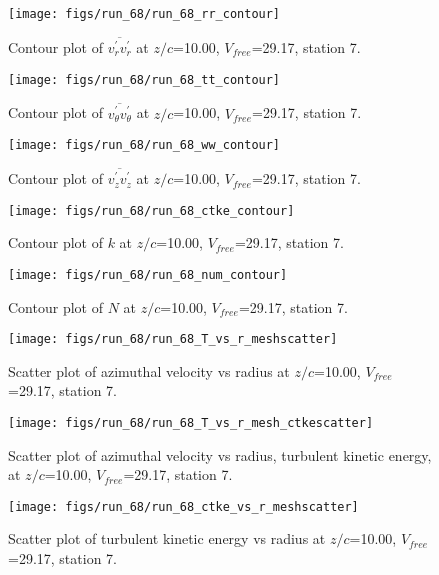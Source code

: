 \begin{figure}[H]
\centering
\texttt{[image: figs/run\_68/run\_68\_rr\_contour]}
\caption{Contour plot of $\overline{v_{r}^{\prime} v_{r}^{\prime}}$ at $z/c$=10.00, $V_{free}$=29.17, station 7.}
\end{figure}


\begin{figure}[H]
\centering
\texttt{[image: figs/run\_68/run\_68\_tt\_contour]}
\caption{Contour plot of $\overline{v_{\theta}^{\prime} v_{\theta}^{\prime}}$ at $z/c$=10.00, $V_{free}$=29.17, station 7.}
\end{figure}


\begin{figure}[H]
\centering
\texttt{[image: figs/run\_68/run\_68\_ww\_contour]}
\caption{Contour plot of $\overline{v_{z}^{\prime} v_{z}^{\prime}}$ at $z/c$=10.00, $V_{free}$=29.17, station 7.}
\end{figure}


\begin{figure}[H]
\centering
\texttt{[image: figs/run\_68/run\_68\_ctke\_contour]}
\caption{Contour plot of $k$ at $z/c$=10.00, $V_{free}$=29.17, station 7.}
\end{figure}


\begin{figure}[H]
\centering
\texttt{[image: figs/run\_68/run\_68\_num\_contour]}
\caption{Contour plot of $N$ at $z/c$=10.00, $V_{free}$=29.17, station 7.}
\end{figure}


\begin{figure}[H]
\centering
\texttt{[image: figs/run\_68/run\_68\_T\_vs\_r\_meshscatter]}
\caption{Scatter plot of azimuthal velocity vs radius at $z/c$=10.00, $V_{free}$=29.17, station 7.}
\end{figure}


\begin{figure}[H]
\centering
\texttt{[image: figs/run\_68/run\_68\_T\_vs\_r\_mesh\_ctkescatter]}
\caption{Scatter plot of azimuthal velocity vs radius, turbulent kinetic energy, at $z/c$=10.00, $V_{free}$=29.17, station 7.}
\end{figure}


\begin{figure}[H]
\centering
\texttt{[image: figs/run\_68/run\_68\_ctke\_vs\_r\_meshscatter]}
\caption{Scatter plot of turbulent kinetic energy vs radius at $z/c$=10.00, $V_{free}$=29.17, station 7.}
\end{figure}



